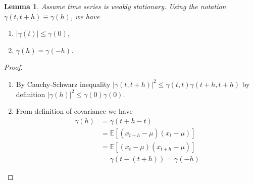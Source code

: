 \documentclass[10pt]{article}
\theoremstyle{remark}
\theoremstyle{plain}
\newtheorem{Lemma}{Lemma}[section]
\numberwithin{equation}{section}
\renewcommand{\leq}{\leqslant}
\begin{document}
\begin{Lemma}
	Assume time series is weakly stationary. Using the notation $\gamma (t, t+h) \equiv \gamma (h)$, we have
	\begin{enumerate}
		\item $|\gamma (t)| \leq \gamma(0)$,
		
		\item $\gamma(h) = \gamma(-h)$.
	\end{enumerate}
\end{Lemma}

\begin{proof}
	\begin{enumerate}
		\item By Cauchy-Schwarz inequality $|\gamma (t, t+h)|^2 \leq \gamma(t,t) \gamma(t+h,t+h)$ by definition $|\gamma(h)|^2 \leq \gamma(0) \gamma(0)$.
		
		\item From definition of covariance we have
		\begin{align*} 
			\gamma(h) &= \gamma(t+h-t)\\
			& = \mathds{E}\left[(x_{t+h}-\mu)(x_t - \mu)\right]\\
			& = \mathds{E}\left[(x_t - \mu)(x_{t+h}-\mu)\right]\\
			& = \gamma(t-(t+h)) = \gamma(-h)
		\end{align*}
	\end{enumerate}
\end{proof}
\end{document}
